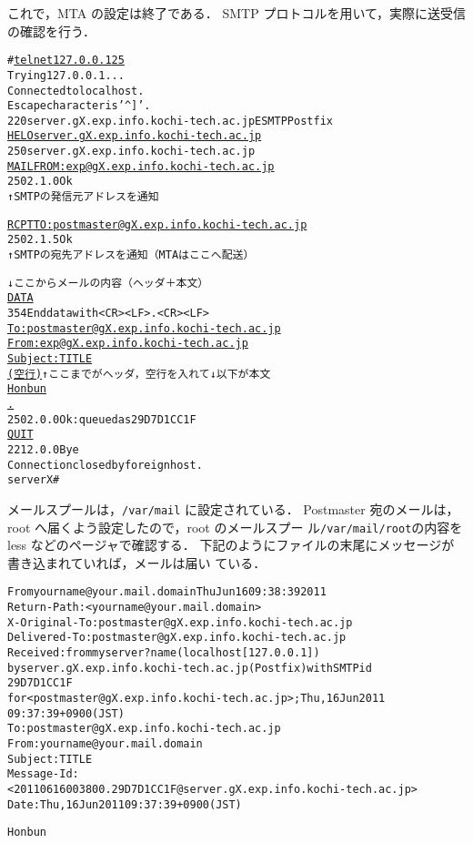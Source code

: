これで，MTA の設定は終了である．
SMTP プロトコルを用いて，実際に送受信の確認を行う．

\begin{center}
\begin{breakbox}
\begin{alltt}
# \underline{telnet 127.0.0.1 25}
Trying 127.0.0.1...
Connected to localhost.
Escape character is '^]'.
220 server.gX.exp.info.kochi-tech.ac.jp ESMTP Postfix
\underline{HELO server.gX.exp.info.kochi-tech.ac.jp}
250 server.gX.exp.info.kochi-tech.ac.jp
\underline{MAIL FROM: exp@gX.exp.info.kochi-tech.ac.jp}
250 2.1.0 Ok
  ↑SMTP の発信元アドレスを通知

\underline{RCPT TO: postmaster@gX.exp.info.kochi-tech.ac.jp}
250 2.1.5 Ok
  ↑SMTP の宛先アドレスを通知（MTAはここへ配送）

  ↓ここからメールの内容（ヘッダ＋本文）
\underline{DATA}
354 End data with <CR><LF>.<CR><LF>
\underline{To: postmaster@gX.exp.info.kochi-tech.ac.jp}
\underline{From: exp@gX.exp.info.kochi-tech.ac.jp}
\underline{Subject: TITLE}
\underline{(空行)}   ↑ここまでがヘッダ，空行を入れて↓以下が本文
\underline{Honbun}
\underline{.}
250 2.0.0 Ok: queued as 29D7D1CC1F
\underline{QUIT}
221 2.0.0 Bye
Connection closed by foreign host.
serverX#
\end{alltt}
\end{breakbox}
\end{center}

メールスプールは，\texttt{/var/mail} に設定されている．
Postmaster 宛のメールは，root へ届くよう設定したので，root のメールスプー
ル\texttt{/var/mail/root}の内容を less などのページャで確認する．
下記のようにファイルの末尾にメッセージが書き込まれていれば，メールは届い
ている．

\begin{center}
\begin{breakbox}
\begin{alltt}
From yourname@your.mail.domain  Thu Jun 16 09:38:39 2011
Return-Path: <yourname@your.mail.domain>
X-Original-To: postmaster@gX.exp.info.kochi-tech.ac.jp
Delivered-To: postmaster@gX.exp.info.kochi-tech.ac.jp
Received: from myserver?name (localhost [127.0.0.1])
        by server.gX.exp.info.kochi-tech.ac.jp (Postfix) with SMTP id
	29D7D1CC1F
        for <postmaster@gX.exp.info.kochi-tech.ac.jp>; Thu, 16 Jun 2011
	09:37:39 +0900 (JST)
To: postmaster@gX.exp.info.kochi-tech.ac.jp
From: yourname@your.mail.domain
Subject: TITLE
Message-Id:
<20110616003800.29D7D1CC1F@server.gX.exp.info.kochi-tech.ac.jp>
Date: Thu, 16 Jun 2011 09:37:39 +0900 (JST)

Honbun
\end{alltt}
\end{breakbox}
\end{center}

